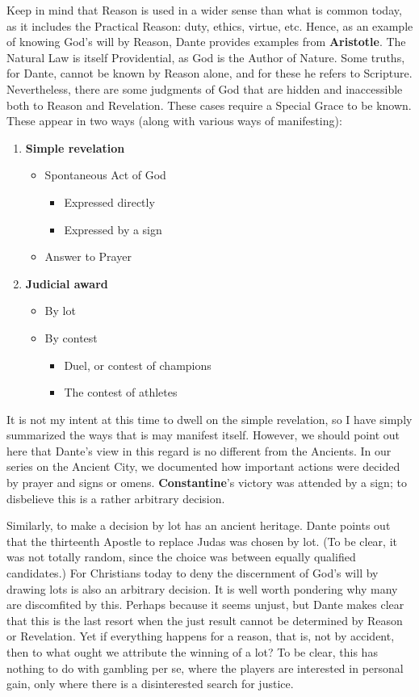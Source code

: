 Keep in mind that Reason is used in a wider sense than what is common today, as it includes the Practical Reason: duty, ethics, virtue, etc. Hence, as an example of knowing God's will by Reason, Dante provides examples from \textbf{Aristotle}. The Natural Law is itself Providential, as God is the Author of Nature. Some truths, for Dante, cannot be known by Reason alone, and for these he refers to Scripture. Nevertheless, there are some judgments of God that are hidden and inaccessible both to Reason and Revelation. These cases require a Special Grace to be known. These appear in two ways (along with various ways of manifesting):

\begin{enumerate}
\item \textbf{Simple revelation}
  \begin{itemize}
	\item Spontaneous Act of God
    \begin{itemize}
		\item Expressed directly
		\item Expressed by a sign
    \end{itemize}
	\item Answer to Prayer
  \end{itemize}
\item \textbf{Judicial award}
  \begin{itemize}
	\item By lot
	\item By contest
	\begin{itemize}
		\item Duel, or contest of champions
		\item The contest of athletes
    \end{itemize}
\end{itemize}
\end{enumerate}


It is not my intent at this time to dwell on the simple revelation, so I have simply summarized the ways that is may manifest itself. However, we should point out here that Dante's view in this regard is no different from the Ancients. In our series on the Ancient City, we documented how important actions were decided by prayer and signs or omens. \textbf{Constantine}'s victory was attended by a sign; to disbelieve this is a rather arbitrary decision.

Similarly, to make a decision by lot has an ancient heritage. Dante points out that the thirteenth Apostle to replace Judas was chosen by lot. (To be clear, it was not totally random, since the choice was between equally qualified candidates.) For Christians today to deny the discernment of God's will by drawing lots is also an arbitrary decision. It is well worth pondering why many are discomfited by this. Perhaps because it seems unjust, but Dante makes clear that this is the last resort when the just result cannot be determined by Reason or Revelation. Yet if everything happens for a reason, that is, not by accident, then to what ought we attribute the winning of a lot? To be clear, this has nothing to do with gambling per se, where the players are interested in personal gain, only where there is a disinterested search for justice.

